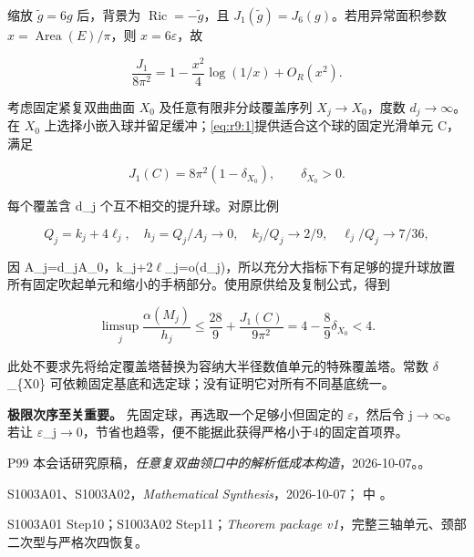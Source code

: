 \documentclass[UTF8,11pt,fontset=none]{ctexart}
\begin{document}
缩放 \(\widetilde g=6g\) 后，背景为 \(\operatorname{Ric}=-\widetilde g\)，且 \(J_1(\widetilde g)=J_6(g)\)。若用异常面积参数 \(x=\operatorname{Area}(E)/\pi\)，则 \(x=6\varepsilon\)，故

\[
\frac{J_1}{8\pi^2}
=1-\frac{x^2}{4}\log(1/x)+O_R(x^2).
\]

考虑固定紧复双曲曲面 \(X_0\) 及任意有限非分歧覆盖序列 \(X_j\to X_0\)，度数 \(d_j\to\infty\)。在 \(X_0\) 上选择小嵌入球并留足缓冲；\eqref{eq:r9:1}提供适合这个球的固定光滑单元 C，满足

\[
 J_1(C)=8\pi^2(1-\delta_{X_0}),\qquad\delta_{X_0}>0.
\]

每个覆盖含 d\_j 个互不相交的提升球。对原比例

\[
 Q_j=k_j+4\ell_j,\quad h_j=Q_j/A_j\to0,\quad
 k_j/Q_j\to2/9,\quad \ell_j/Q_j\to7/36,
\]

因 A\_j=d\_jA\_0，k\_j+2\(\ell\)\_j=o(d\_j)，所以充分大指标下有足够的提升球放置所有固定吹起单元和缩小的手柄部分。使用原供给及复制公式，得到

\[
\boxed{
\limsup_j\frac{\alpha(M_j)}{h_j}
\le\frac{28}{9}+\frac{J_1(C)}{9\pi^2}
=4-\frac89\delta_{X_0}<4.
}
\tag{9.8}\label{eq:r9:8}
\]

此处不要求先将给定覆盖塔替换为容纳大半径数值单元的特殊覆盖塔。常数 \(\delta\)\_\{X0\} 可依赖固定基底和选定球；没有证明它对所有不同基底统一。

\textbf{极限次序至关重要。} 先固定球，再选取一个足够小但固定的 \(\varepsilon\)，然后令 j\(\to\)\(\infty\)。若让 \(\varepsilon\)\_j\(\to\)0，节省也趋零，便不能据此获得严格小于4的固定首项界。

\begin{thebibliography}{P99}
\small
{} 本会话研究原稿，\emph{任意复双曲领口中的解析低成本构造}，2026-10-07。。

 S1003A01、S1003A02，\emph{Mathematical Synthesis}，2026-10-07； 中 。

 S1003A01 Step10；S1003A02 Step11；\emph{Theorem package v1}，完整三轴单元、颈部二次型与严格次四恢复。

\end{thebibliography}
\end{document}
